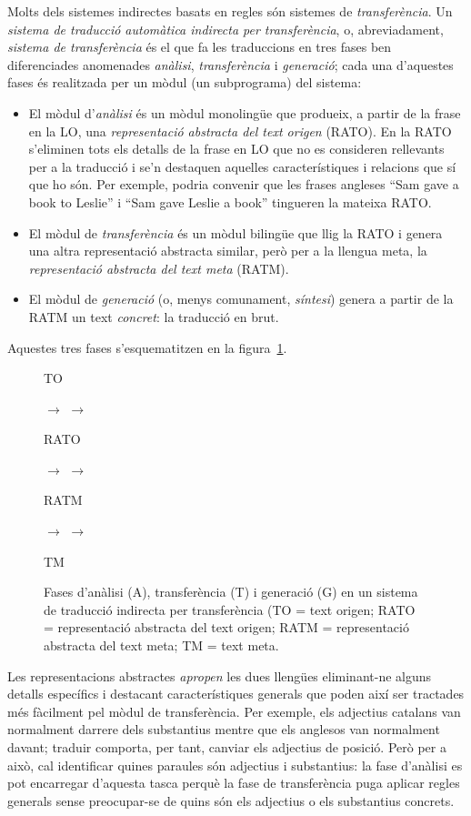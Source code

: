 \label{ss:classtrans}
Molts dels sistemes indirectes basats en regles són sistemes de
\emph{transferència}. Un \emph{sistema de traducció automàtica
  indirecta per transferència}, o, abreviadament, \emph{sistema de
  transferència} és el que fa les traduccions en tres fases ben
diferenciades anomenades \emph{anàlisi}, \emph{transferència} i
\emph{generació}; cada una d'aquestes fases és realitzada per un mòdul
(un subprograma) del sistema:
\begin{itemize}
\item El mòdul d'\emph{anàlisi} és un mòdul monolingüe que produeix, a
  partir de la frase en la LO, una \emph{representació abstracta del text
  origen} (RATO). En la RATO s'eliminen tots els detalls de la frase
  en LO que no es consideren rellevants per a la traducció i se'n destaquen
  aquelles característiques i relacions que sí que ho són.  Per
  exemple, podria convenir que les frases angleses ``Sam gave a book
  to Leslie'' i ``Sam gave Leslie a book'' \citep{arnold93j} tingueren
  la mateixa RATO.
\item El mòdul de \emph{transferència} és un mòdul bilingüe que llig
  la RATO i genera una altra representació abstracta similar, però per
  a la llengua meta, la \emph{representació abstracta del text meta}
  (RATM).
\item El mòdul de \emph{generació} (o, menys comunament,
  \emph{síntesi}) genera a partir de la RATM un text \emph{concret}: la
  traducció en brut.
\end{itemize}
Aquestes tres fases s'esquematitzen en la
figura~\ref{fg:transfer}. 


\begin{figure}
\begin{center}
\parbox{0.5cm}{TO} $\to$
 $\to$ 
\parbox{1.0cm}{RATO} $\to$
 $\to$
\parbox{1.25cm}{RATM} $\to$
 $\to$
\parbox{0.5cm}{TM} 
\end{center}
\caption{Fases d'anàlisi (A), transferència (T) i generació (G) en un
sistema de traducció indirecta per transferència (TO = text origen; RATO = representació abstracta del text origen; RATM = representació abstracta del text meta; TM = text meta.}
\label{fg:transfer} 
\end{figure}

Les representacions abstractes \emph{apropen} les dues llengües
eliminant-ne alguns detalls específics i destacant característiques
generals que poden així ser tractades més fàcilment pel mòdul de
transferència. Per exemple, els adjectius catalans van normalment
darrere dels substantius mentre que els anglesos van normalment
davant; traduir comporta, per tant, canviar els adjectius de
posició. Però per a això, cal identificar quines paraules són
adjectius i substantius: la fase d'anàlisi es pot encarregar d'aquesta
tasca perquè la fase de transferència puga aplicar regles generals
sense preocupar-se de quins són els adjectius o els substantius
concrets.


